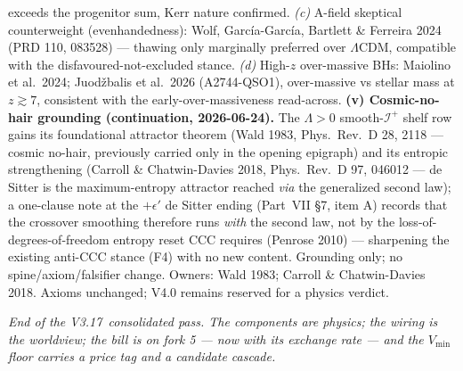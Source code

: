 \documentclass[11pt]{article}
\newcommand{\lmuver}{3.17}
\begin{document}
exceeds the progenitor sum, Kerr nature confirmed. \emph{(c)} A-field skeptical counterweight (evenhandedness): Wolf, Garc\'ia-Garc\'ia, Bartlett \& Ferreira 2024 (PRD 110, 083528) --- thawing only marginally preferred over $\Lambda$CDM, compatible with the disfavoured-not-excluded stance. \emph{(d)} High-$z$ over-massive BHs: Maiolino et al.\ 2024; Juod\v{z}balis et al.\ 2026 (A2744-QSO1), over-massive vs stellar mass at $z\gtrsim7$, consistent with the early-over-massiveness read-across. \textbf{(v) Cosmic-no-hair grounding (continuation, 2026-06-24).} The $\Lambda>0$ smooth-$\mathscr I^+$ shelf row gains its foundational attractor theorem (Wald 1983, Phys.\ Rev.\ D 28, 2118 --- cosmic no-hair, previously carried only in the opening epigraph) and its entropic strengthening (Carroll \& Chatwin-Davies 2018, Phys.\ Rev.\ D 97, 046012 --- de Sitter is the maximum-entropy attractor reached \emph{via} the generalized second law); a one-clause note at the $+\epsilon'$ de Sitter ending (Part~VII \S7, item A) records that the crossover smoothing therefore runs \emph{with} the second law, not by the loss-of-degrees-of-freedom entropy reset CCC requires (Penrose 2010) --- sharpening the existing anti-CCC stance (F4) with no new content. Grounding only; no spine/axiom/falsifier change. Owners: Wald 1983; Carroll \& Chatwin-Davies 2018. Axioms unchanged; V4.0 remains reserved for a physics verdict.

\vspace{6pt}\centering\small\textit{End of the V\lmuver\ consolidated pass. The components are physics; the wiring is the worldview; the bill is on fork 5 --- now with its exchange rate --- and the $V_{\min}$ floor carries a price tag and a candidate cascade.}
\end{document}
